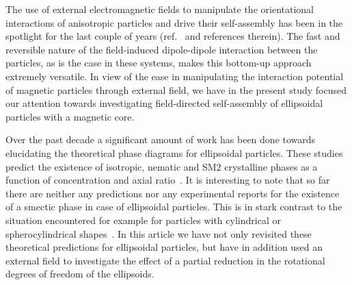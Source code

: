 \documentclass[aps,prl,preprint,superscriptaddress]{revtex4-1} %
\begin{document}
The use of external electromagnetic fields to manipulate the orientational interactions of anisotropic particles and drive their self-assembly has been in the spotlight for the last couple of years (ref.~\cite{op2013phase, Schurtenberger2016, ganesan2017high, shah2015actuation} and references therein). The fast and reversible nature of the field-induced dipole-dipole interaction between the particles, as is the case in these systems, makes this bottom-up approach extremely versatile. In view of the ease in manipulating the interaction potential of magnetic particles through external field, we have in the present study focused our attention towards investigating field-directed self-assembly of ellipsoidal particles with a magnetic core.\par
Over the past decade a significant amount of work has been done towards elucidating the theoretical phase diagrams for ellipsoidal particles. These studies predict the existence of isotropic, nematic and SM2 crystalline phases as a function of concentration and axial ratio~\cite{radu2009solid, odriozola2012revisiting, pfleiderer2008crystal}. It is interesting to note that so far there are neither any predictions nor any experimental reports for the existence of a smectic phase in case of ellipsoidal particles. This is in stark contrast to the situation encountered for example for particles with cylindrical or spherocylindrical shapes~\cite{Bolhuis1997, lekkerkerker2013liquid}. In this article we have not only revisited these theoretical predictions for ellipsoidal particles, but have in addition used an external field to investigate the effect of a partial reduction in the rotational degrees of freedom of the ellipsoids.\par
\end{document}
